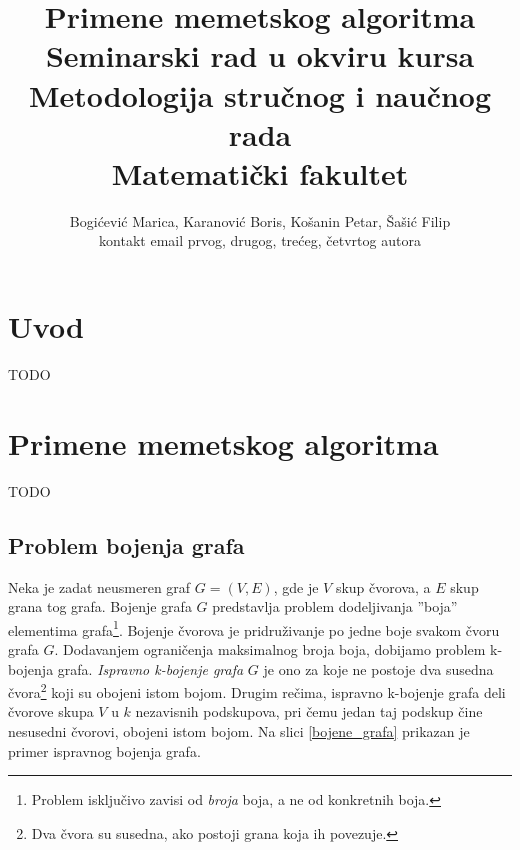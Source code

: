 \documentclass[a4paper]{article}
\begin{document}
\title{Primene memetskog algoritma\\ \small{Seminarski rad u okviru kursa\\Metodologija stručnog i naučnog rada\\ Matematički fakultet}}

\author{Bogićević Marica, Karanović Boris, Košanin Petar, Šašić Filip\\ kontakt email prvog, drugog, trećeg, četvrtog autora}


\maketitle


\tableofcontents

\newpage

\section{Uvod}
\label{sec:uvod}

TODO



\section{Primene memetskog algoritma}
\label{sec:primene_memetskog_algoritma}
TODO


\subsection{Problem bojenja grafa}
\label{sec:bojenje_grafa}
Neka je zadat neusmeren graf $G = (V, E)$, gde je $V$ skup čvorova, a $E$ skup grana tog grafa. 
Bojenje grafa $G$ predstavlja problem dodeljivanja ''boja'' elementima grafa\footnote{Problem isključivo zavisi od \textit{broja} boja, a ne od konkretnih boja.}. 
Bojenje čvorova je pridruživanje po jedne boje svakom čvoru grafa $G$. 
Dodavanjem ograničenja maksimalnog broja boja, dobijamo problem k-bojenja grafa. \textit{Ispravno k-bojenje grafa} $G$ je ono za koje ne postoje dva susedna čvora\footnote{Dva čvora su susedna, ako postoji grana koja ih povezuje.} koji su obojeni istom bojom. 
Drugim rečima, ispravno k-bojenje grafa deli čvorove skupa $V$ u $k$ nezavisnih podskupova, pri čemu jedan taj podskup čine nesusedni čvorovi, obojeni istom bojom. Na slici \ref{bojene_grafa} prikazan je primer ispravnog bojenja grafa.
\end{document}
